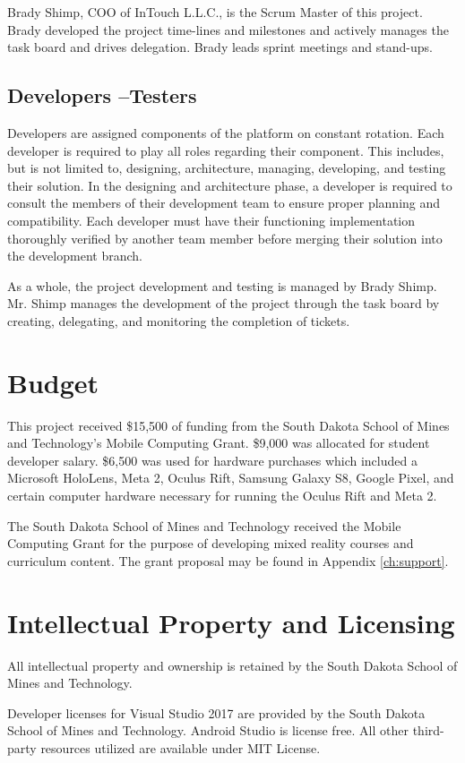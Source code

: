 Brady Shimp, COO of InTouch L.L.C., is the Scrum Master of this project. Brady developed the project time-lines and milestones and actively manages the task board and drives delegation. Brady leads sprint meetings and stand-ups. 

\subsection{Developers --Testers}

Developers are assigned components of the platform on constant rotation. Each developer is required to play all roles regarding their component. This includes, but is not limited to, designing, architecture, managing, developing, and testing their solution. In the designing and architecture phase, a developer is required to consult the members of their development team to ensure proper planning and compatibility. Each developer must have their functioning implementation thoroughly verified by another team member before merging their solution into the development branch. 

As a whole, the project development and testing is managed by Brady Shimp. Mr. Shimp manages the development of the project through the task board by creating, delegating, and monitoring the completion of tickets. 

\section{Budget}

This project received \$15,500 of funding from the South Dakota School of Mines and Technology's Mobile Computing Grant. \$9,000 was allocated for student developer salary. \$6,500 was used for hardware purchases which included a Microsoft HoloLens, Meta 2, Oculus Rift, Samsung Galaxy S8, Google Pixel, and certain computer hardware necessary for running the Oculus Rift and Meta 2. 
 
The South Dakota School of Mines and Technology received the Mobile Computing Grant for the purpose of developing mixed reality courses and curriculum content. The grant proposal may be found in Appendix \ref{ch:support}.

\section{Intellectual Property and Licensing}

All intellectual property and ownership is retained by the South Dakota School of Mines and Technology.

Developer licenses for Visual Studio 2017 are provided by the South Dakota School of Mines and Technology. Android Studio is license free. All other third-party resources utilized are available under MIT License. 

